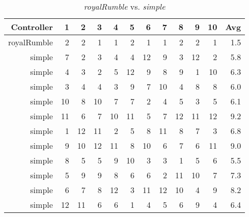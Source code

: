 \begin{table}[H]
\centering
\caption{\emph{royalRumble} vs. \emph{simple}}
\label{checkSix vs. simple}
\begin{tabular}{r|r|r|r|r|r|r|r|r|r|r|r}
Controller	& 1	 & 2  & 3  & 4  & 5  & 6  & 7  & 8  & 9  & 10 & Avg \\ \hline
royalRumble & 2	 & 2  &	1  & 1  & 2  & 1  & 1  & 2  & 2  & 1  & 1.5 \\
simple		& 7	 & 2  &	3  & 4  & 4  & 12 & 9  & 3  & 12 & 2  & 5.8 \\
simple		& 4	 & 3  &	2  & 5  & 12 & 9  & 8  & 9  & 1  & 10 & 6.3 \\
simple		& 3	 & 4  &	4  & 3  & 9  & 7  & 10 & 4  & 8  & 8  & 6.0 \\
simple		& 10 & 8  & 10 & 7  & 7  & 2  & 4  & 5  & 3  & 5  & 6.1 \\
simple		& 11 & 6  & 7  & 10 & 11 & 5  & 7  & 12 & 11 & 12 & 9.2 \\
simple		& 1  & 12 & 11 & 2  & 5  & 8  & 11 & 8  & 7  & 3  & 6.8 \\
simple		& 9  & 10 & 12 & 11 & 8  & 10 & 6  & 7  & 6  & 11 & 9.0 \\
simple		& 8  & 5  & 5  & 9  & 10 & 3  & 3  & 1  & 5  & 6  & 5.5 \\
simple		& 5  & 9  & 9  & 8  & 6  & 6  & 2  & 11 & 10 & 7  & 7.3 \\
simple		& 6  & 7  & 8  & 12 & 3  & 11 & 12 & 10 & 4  & 9  & 8.2 \\
simple		& 12 & 11 & 6  & 6  & 1  & 4  & 5  & 6  & 9  & 4  & 6.4
\end{tabular}
\end{table}